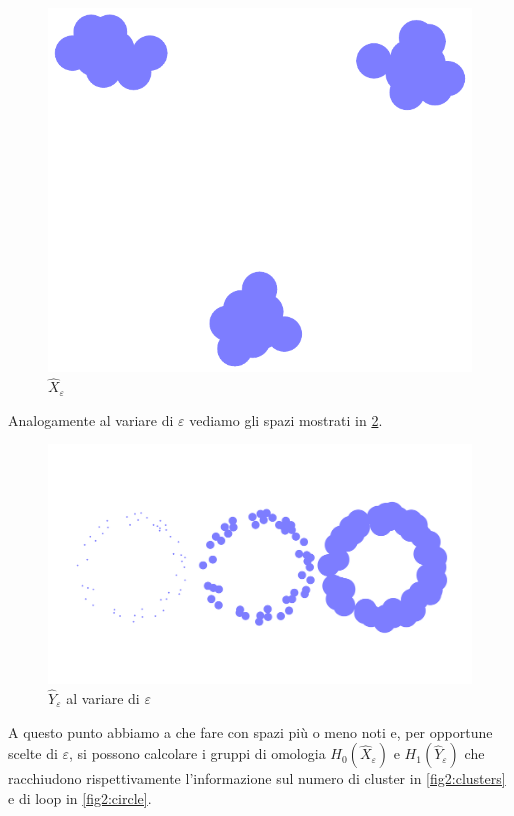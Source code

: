 \begin{figure}[h]
  \begin{center}
    \includegraphics[width=.4\linewidth]{gfx/three_clusters_fat.pdf}
    \caption{$\widehat{X}_\varepsilon$}
    \label{fig2:clusters_fat}
  \end{center}
\end{figure}

Analogamente al variare di $\varepsilon$ vediamo gli spazi mostrati in \cref{fig2:circlecomparison}.

\begin{figure}[h]
  \begin{center}
    \includegraphics[width=.9\linewidth]{gfx/statistical_circle_comparison.pdf}
    \caption{$\widehat{Y}_\varepsilon$ al variare di $\varepsilon$}
    \label{fig2:circlecomparison}
  \end{center}
\end{figure}

A questo punto abbiamo a che fare con spazi più o meno noti e, per opportune scelte di $\varepsilon$, si possono calcolare i gruppi di omologia $H_0(\widehat{X}_\varepsilon)$ e $H_1(\widehat{Y}_\varepsilon)$ che racchiudono rispettivamente l'informazione sul numero di cluster in \cref{fig2:clusters} e di loop in \cref{fig2:circle}.


